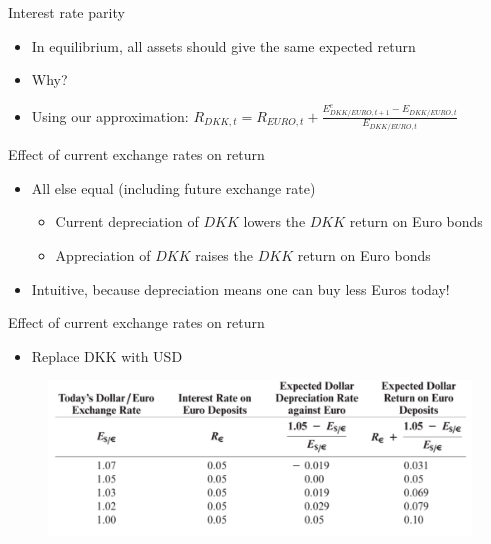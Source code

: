 \documentclass{beamer}
\begin{document}
\begin{frame}{Interest rate parity}

    \begin{itemize}
        \item In equilibrium, all assets should give the same expected return
        \item Why?
        \item Using our approximation:
    $R_{DKK,t} = R_{EURO,t} + \frac{E^{e}_{DKK/EURO, t+1} - E_{DKK/EURO,t}}{E_{DKK/EURO,t}}$
    \end{itemize}

\end{frame}


\begin{frame}{Effect of current exchange rates on return}

    \begin{itemize}
        \item All else equal (including future exchange rate)
        \begin{itemize}
            \item Current depreciation of $DKK$ lowers the $DKK$ return on Euro bonds
            \item Appreciation of $DKK$ raises the $DKK$ return on Euro bonds
        \end{itemize}
        \item Intuitive, because depreciation means one can buy less Euros today!
    \end{itemize}

\end{frame}

\begin{frame}{Effect of current exchange rates on return}
\begin{itemize}
\item Replace DKK with USD
\end{itemize}
\begin{figure}
	\centering
		\includegraphics[scale=0.24]{ex_return.png}
\end{figure}
\end{frame}
\end{document}
